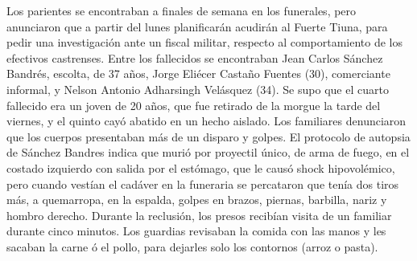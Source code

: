 \documentclass{article}%
\begin{document}
\newline%
%
Los parientes se encontraban a finales de semana en los funerales, pero anunciaron que a partir del lunes planificarán acudirán al Fuerte Tiuna, para pedir una investigación ante un fiscal militar, respecto al comportamiento de los efectivos castrenses.%
\newline%
%
Entre los fallecidos se encontraban Jean Carlos Sánchez Bandrés, escolta, de 37 años, Jorge Eliécer Castaño Fuentes (30), comerciante informal, y Nelson Antonio Adharsingh Velásquez (34).%
\newline%
%
Se supo que el cuarto fallecido era un joven de 20 años, que fue retirado de la morgue la tarde del viernes, y el quinto cayó abatido en un hecho aislado.\newline%
\newline%
Los familiares denunciaron que los cuerpos presentaban más de un disparo y golpes.%
\newline%
%
El protocolo de autopsia de Sánchez Bandres indica que murió por proyectil único, de arma de fuego, en el costado izquierdo con salida por el estómago, que le causó shock hipovolémico, pero cuando vestían el cadáver en la funeraria se percataron que tenía dos tiros más, a quemarropa, en la espalda, golpes en brazos, piernas, barbilla, nariz y hombro derecho.%
\newline%
%
Durante la reclusión, los presos recibían visita de un familiar durante cinco minutos. Los guardias revisaban la comida con las manos y les sacaban la carne ó el pollo, para dejarles solo los contornos (arroz o pasta).%
\newline%
%
\end{document}
